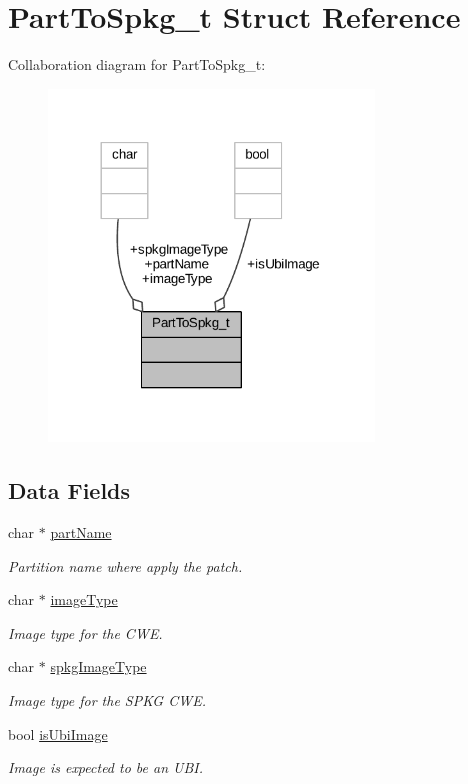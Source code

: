 \hypertarget{struct_part_to_spkg__t}{}\section{Part\+To\+Spkg\+\_\+t Struct Reference}
\label{struct_part_to_spkg__t}


Collaboration diagram for Part\+To\+Spkg\+\_\+t\+:
\nopagebreak
\begin{figure}[H]
\begin{center}
\leavevmode
\includegraphics[width=245pt]{struct_part_to_spkg__t__coll__graph}
\end{center}
\end{figure}
\subsection*{Data Fields}
\begin{DoxyCompactItemize}
\item 
char $\ast$ \hyperlink{struct_part_to_spkg__t_afacd3fe7740e3294350e8c63d5e9d9e1}{part\+Name}
\begin{DoxyCompactList}\small\item\em Partition name where apply the patch. \end{DoxyCompactList}\item 
char $\ast$ \hyperlink{struct_part_to_spkg__t_ab7ee6f2d56ac53cfddf7051581516d0f}{image\+Type}
\begin{DoxyCompactList}\small\item\em Image type for the C\+WE. \end{DoxyCompactList}\item 
char $\ast$ \hyperlink{struct_part_to_spkg__t_a756c25a9a3e10451d6a00cec8714dfb0}{spkg\+Image\+Type}
\begin{DoxyCompactList}\small\item\em Image type for the S\+P\+KG C\+WE. \end{DoxyCompactList}\item 
bool \hyperlink{struct_part_to_spkg__t_a101617360579c847f62feaabad840390}{is\+Ubi\+Image}
\begin{DoxyCompactList}\small\item\em Image is expected to be an U\+BI. \end{DoxyCompactList}\end{DoxyCompactItemize}


